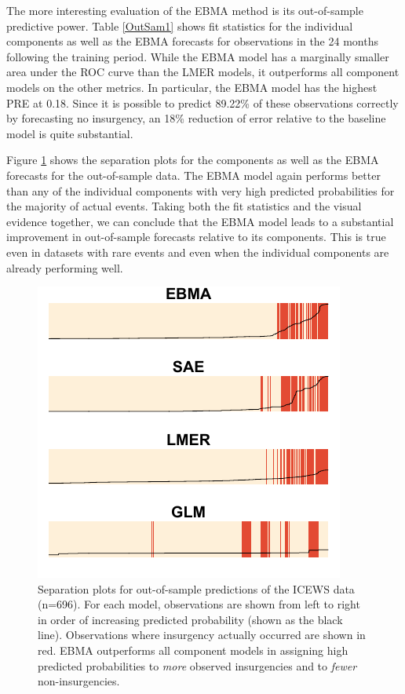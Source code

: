 \documentclass[12pt,fullpage]{article}
\begin{document}
The more interesting evaluation of the EBMA method is its
out-of-sample predictive power. Table \ref{OutSam1} shows fit
statistics for the individual components as well as the EBMA forecasts
for observations in the 24 months following the training period.
While the EBMA model has a marginally smaller area under the ROC curve
than the LMER models, it outperforms all component models on the other
metrics. In particular, the EBMA model has the highest PRE at 0.18.
Since it is possible to predict 89.22\% of these observations
correctly by forecasting no insurgency, an 18\% reduction of error
relative to the baseline model is quite substantial.

Figure \ref{OutSam1sep} shows the separation plots for the components
as well as the EBMA forecasts for the out-of-sample data.  The EBMA
model again performs better than any of the individual components with
very high predicted probabilities for the majority of actual events.
Taking both the fit statistics and the visual evidence together, we
can conclude that the EBMA model leads to a substantial improvement in
out-of-sample forecasts relative to its components.  This is true even
in datasets with rare events and even when the individual components
are already performing well.


\begin{figure}
  \caption{\footnotesize Separation plots for out-of-sample
    predictions of the ICEWS data (n=696).  For each model,
    observations are shown from left to right in order of increasing
    predicted probability (shown as the black line).  Observations
    where insurgency actually occurred are shown in red.  EBMA
    outperforms all component models in assigning high predicted
    probabilities to \textit{more} observed insurgencies and to
    \textit{fewer} non-insurgencies.}
\label{OutSam1sep}
\begin{center}
\includegraphics[]{OutSampleNew.pdf}
\end{center}
\end{figure}
\end{document}
